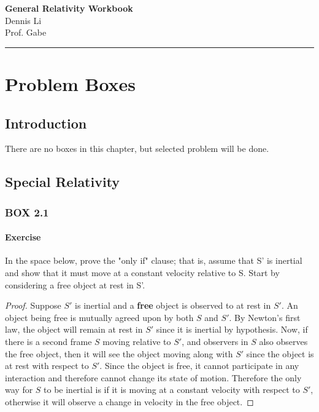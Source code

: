 \documentclass[12pt]{book}
\newif\ifshow
\begin{document}
\begin{center}
\ifshow
  \textbf{\Large GRW Workbook}\\
\else
  \textbf{\Large General Relativity Workbook}\\
\fi
Dennis Li\\Prof. Gabe\\
\end{center}

\hrule

\vspace{0.2cm}
\chapter{Problem Boxes}
\section{Introduction}
There are no boxes in this chapter, but selected problem will be done.

\section{Special Relativity}
\subsection{BOX 2.1}
\subsubsection{Exercise}
In the space below, prove the "only if" clause; that is, assume that S' is inertial and show that it must move at a constant velocity relative to S. Start by considering a free object at rest in S'.

\begin{proof}
    Suppose $S'$ is inertial and a \textbf{free} object is observed to at rest in $S'$. An object being free is mutually agreed upon by both $S$ and $S'$. By Newton's first law, the object will remain at rest in $S'$ since it is inertial by hypothesis. Now, if there is a second frame $S$ moving relative to $S'$, and observers in $S$ also observes the free object, then it will see the object moving along with $S'$ since the object is at rest with respect to $S'$. Since the object is free, it cannot participate in any interaction and therefore cannot change its state of motion. Therefore the only way for $S$ to be inertial is if it is moving at a constant velocity with respect to $S'$, otherwise it will observe a change in velocity in the free object.  
\end{proof}
\end{document}
